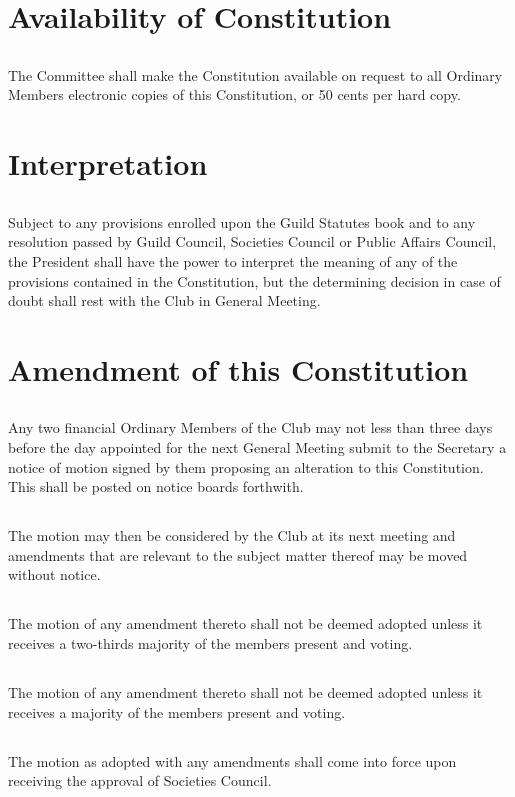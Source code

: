\documentclass[10.5pt]{article}
\begin{document}
\section{Availability of Constitution}
\subsection{} The Committee shall make the Constitution available on request to all Ordinary Members electronic copies of this Constitution, or 50 cents per hard copy. 
\newline


\section{Interpretation}
\subsection{} Subject to any provisions enrolled upon the Guild Statutes book and to any resolution passed by Guild Council, Societies Council or Public Affairs Council, the President shall have the power to interpret the meaning of any of the provisions contained in the Constitution, but the determining decision in case of doubt shall rest with the Club in General Meeting. 
\newline


\section{Amendment of this Constitution}
\subsection{} Any two financial Ordinary Members of the Club may not less than three days before the day appointed for the next General Meeting submit to the Secretary a notice of motion signed by them proposing an alteration to this Constitution. This shall be posted on notice boards forthwith. 
\subsection{} The motion may then be considered by the Club at its next meeting and amendments that are relevant to the subject matter thereof may be moved without notice.
\subsection{}The motion of any amendment thereto shall not be deemed adopted unless it receives a two-thirds majority of the members present and voting. 
\subsection{} The motion of any amendment thereto shall not be deemed adopted unless it receives a majority of the members present and voting. 
\subsection{} The motion as adopted with any amendments shall come into force upon receiving the approval of Societies Council.
\end{document}

